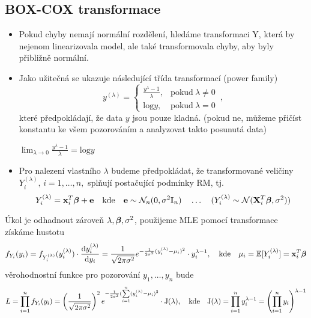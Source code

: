 \subsection{BOX-COX transformace}
\begin{itemize}
\item Pokud chyby nemají normální rozdělení, hledáme transformaci Y, která by nejenom linearizovala model, ale také transformovala chyby, aby byly přibližně normální.
\item Jako užitečná se ukazuje následující třída transformací (power family)
$$
 y^{(\lambda)} = \begin{cases}
      \frac{y^{\lambda}-1}{\lambda}, & \text{pokud}\ \lambda \neq 0 \\
      \text{log}y, & \text{pokud}\ \lambda = 0
    \end{cases} \, ,
$$
které předpokládají, že data $ y $ jsou pouze kladná. (pokud ne, můžeme přičíst konstantu ke všem pozorováním a analyzovat takto posunutá data)
\begin{remark}
$ \lim_{\lambda \rightarrow 0}  \frac{y^{\lambda}-1}{\lambda} = \text{log}y $
\end{remark}
\item Pro nalezení vlastního $ \lambda $ budeme předpokládat, že transformované veličiny $ Y_i^{(\lambda)}, \, i = 1,\dots,n, $ splňují postačující podmínky RM, tj. 
$$
 Y_i^{(\lambda)} = \textbf{x}_i^T \boldsymbol{\beta} + \textbf{e} \quad \text{kde} \quad \textbf{e} \sim \mathcal{N}_n (0,\sigma^2 \mathbb{I}_{n}) \quad \dots \quad ( Y_i^{(\lambda)} \sim \mathcal{N} ( \textbf{X}_i^T \boldsymbol{\beta} , \sigma^2 ))
$$
\end{itemize}
Úkol je odhadnout zároveň $ \lambda , \boldsymbol{\beta} , \sigma^2 $, použijeme MLE pomocí transformace získáme hustotu
$$
  f_{Y_i}(y_i) = f_{Y_i^{(\lambda)}}(y_i^{(\lambda)}) \cdot \dfrac{\mathrm{d} y_i^{(\lambda)}}{\mathrm{d} y_i} = \dfrac{1}{\sqrt{2 \pi \sigma^2}} e^{-\frac{1}{2 \sigma^2}( y_i^{(\lambda)} - \mu_i)^2} \cdot y_i^{\lambda - 1}, \quad \text{kde} \quad \mu_i = \mathbb{E}[Y_i^{(\lambda)}] = \textbf{x}_i^T \boldsymbol{\beta}
$$
věrohodnostní funkce pro pozorování $ y_1,\dots,y_n $ bude
$$
  L = \prod_{i=1}^{n}f_{Y_i}(y_i) = \left( \frac{1}{\sqrt{2 \pi \sigma^2}} \right)^2 e^{-\frac{1}{2 \sigma^2}(\sum\limits_{i=1}^{n} ( y_i^{(\lambda)} - \mu_i )^2} \cdot \text{J}(\lambda), \quad \text{kde} \quad \text{J}(\lambda) = \prod_{i=1}^{n} y_i^{\lambda - 1} = \left( \prod_{i=1}^{n} y_i \right)^{\lambda - 1}
$$

